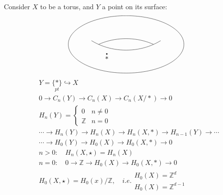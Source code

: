 \documentclass[11pt,a4paper]{report}
\begin{document}
               \begin{Ex} Consider $X$ to be a torus, and $Y$ a point on its surface: \\
               
               \[
               \begin{tikzpicture}
                        \useasboundingbox (-3,-1.5) rectangle (3,1.5);
                        \draw (0,0) ellipse (3 and 1.5);
                        \coordinate [label=below:$\ast$] (0) at (-1,-0.5);
                        \draw[fill] (0) circle [radius=0.03];
                        \begin{scope}
                            \clip (0,-1.8) ellipse (3 and 2.5);
                            \draw (0,2.2) ellipse (3 and 2.5);
                        \end{scope}
                        \begin{scope}
                            \clip (0,2.2) ellipse (3 and 2.5);
                            \draw (0,-2.2) ellipse (3 and 2.5);
                        \end{scope}
                \end{tikzpicture}
                \]
                \begin{align*}
                  &Y = \underset{pt}{\{*\}} \hookrightarrow X\\
                  &0 \rightarrow C_n(Y) \rightarrow C_n(X) \rightarrow C_n(X/\ast) \rightarrow 0\\
                  &H_n(Y) = \left\{ \begin{array}{cc}0&n\ne0\\\mathbb{Z}&n=0\end{array} \right. \quad \\
                  &\cdots \rightarrow H_n(Y) \rightarrow H_n(X) \rightarrow H_n(X,\ast) \rightarrow H_{n-1}(Y) \rightarrow \cdots\\
                  &\cdots \rightarrow H_0(Y) \rightarrow H_0(X) \rightarrow H_0(X,\ast) \rightarrow 0\\
                  &n > 0: \quad H_n(X,\star) = H_n(X)\\
                  &n = 0: \quad 0 \rightarrow \mathbb{Z} \rightarrow H_0(X) \rightarrow H_0(X,\ast) \rightarrow 0\\
                  &H_0(X,\star) = H_0(x)/\mathbb{Z}, \quad i.e. \left.\begin{array}{l}H_0(X) = \mathbb{Z}^d\\H_0(X) = \mathbb{Z}^{d-1}\end{array} \right.\\
                \end{align*}
               \end{Ex}
               
\end{document}
